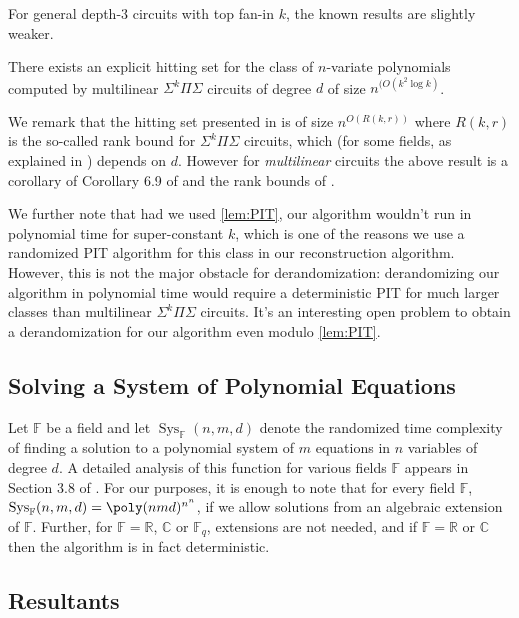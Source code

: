 \documentclass[12pt]{article}
\DeclareMathOperator{\Sys}{\mathrm{Sys}}
\renewcommand{\C}{\mathbb{C}}
\renewcommand{\R}{\mathbb{R}}
\newcommand{\F}{\mathbb{F}}
\newcommand{\SumProdSumk}{\Sigma^k \Pi \Sigma}
\newcommand{\Sps}[1]{\Sigma^{#1} \Pi\Sigma}
\begin{document}
	For general depth-$3$ circuits with top fan-in $k$, the known results are slightly weaker.
	
	\begin{lemma}[\cite{SS12}]
		\label{lem:PIT}
		There exists an explicit hitting set for the class of $n$-variate polynomials computed by multilinear $\SumProdSumk$ circuits of degree $d$ of size $n^{(O(k^2 \log k)}$.
	\end{lemma}
	
	
	We remark that the hitting set presented in \cite{SY10} is of size $n^{O(R(k,r))}$ where $R(k,r)$ is the so-called rank bound for $\SumProdSumk$ circuits, which (for some fields, as explained in \cite{SY10}) depends on $d$. However for \emph{multilinear} circuits the above result is a corollary of Corollary 6.9 of \cite{DS07} and the rank bounds of \cite{SaxenaS13}.
	
	We further note that had we used \autoref{lem:PIT}, our algorithm wouldn't run in polynomial time for super-constant $k$, which is one of the reasons we use a randomized PIT algorithm for this class in our reconstruction algorithm. However, this is not the major obstacle for derandomization: derandomizing our algorithm in polynomial time would require a deterministic PIT for much larger classes than multilinear $\Sps{k}$ circuits. It's an interesting open problem to obtain a derandomization for our algorithm even modulo \autoref{lem:PIT}.
	
	
	
	\subsection{Solving a System of Polynomial Equations}
	\label{sec:sys}
	
	Let $\F$ be a field and let $\Sys_{\F}(n,m,d)$ denote the randomized time complexity of finding a solution to a polynomial system of $m$ equations in $n$ variables of degree $d$. A detailed analysis of this function for various fields $\F$ appears in Section 3.8 of \cite{BSV21}. For our purposes, it is enough to note that for every field $\F$, $\Sys_{\F}(n,m,d) = \poly(nmd)^{n^{n}}$, if we allow solutions from an algebraic extension of $\F$. Further, for $\F=\R$, $\C$ or $\F_q$, extensions are not needed, and if $\F = \R$ or $\C$ then the algorithm is in fact deterministic.
	
	
	\subsection{Resultants}\label{sec:resultant}
	
\end{document}
